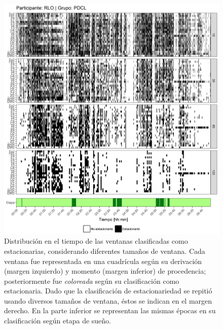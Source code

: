 \begin{figure}
\centering
\includegraphics[width=\linewidth]
{./scripts_graf_res/RLO_patrones_2.png}
\caption[Distribución en el tiempo de las ventanas clasificadas como estacionarias, considerando diferentes tamaños de ventana]{Distribución en el tiempo de las ventanas clasificadas como estacionarias, considerando diferentes tamaños de ventana. 
Cada ventana fue representada en una cuadrícula según su derivación (margen izquierdo) y momento (margen inferior) de procedencia; posteriormente fue \textit{coloreada} según su clasificación como estacionaria.
Dado que la clasificación de estacionariedad se repitió usando diversos tamaños de ventana, éstos se indican en el margen derecho.
En la parte inferior se representan las mismas épocas en su clasificación según etapa de sueño.}
\end{figure}


